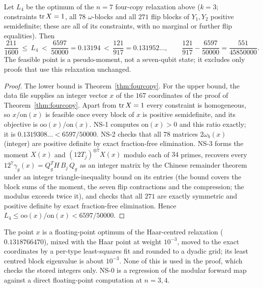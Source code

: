 \begin{proposition}\label{prop:fourcopy-not-sharp}
Let $L_4$ be the optimum of the $n=7$ four-copy relaxation above ($k=3$; constraints $\operatorname{tr} X=1$, all $78$
$\omega$-blocks and all $271$ flip blocks of $Y_1,Y_2$ positive semidefinite; these are all of its constraints,
with no marginal or further flip equalities). Then
\[
 \frac{211}{1600}\ \le\ L_4\ <\ \frac{6597}{50000}=0.13194\ <\ \frac{121}{917}=0.131952\ldots,
 \qquad \frac{121}{917}-\frac{6597}{50000}=\frac{551}{45850000}.
\]
The feasible point is a pseudo-moment, not a seven-qubit state; it excludes only proofs that use this
relaxation unchanged.
\end{proposition}
\begin{proof}
The lower bound is Theorem~\ref{thm:fourcopy}. For the upper bound, the data file supplies an integer
vector $x$ of the $167$ coordinates of the proof of Theorem~\ref{thm:fourcopy}. Apart from $\operatorname{tr} X=1$
every constraint is homogeneous, so $x/\mathrm{on}(x)$ is feasible once every block of $x$ is positive
semidefinite, and its objective is $\mathrm{oo}(x)/\mathrm{on}(x)$. NS-1 computes $\mathrm{on}(x)>0$
and this ratio exactly; it is $0.1319308\ldots<6597/50000$. NS-2 checks that all $78$ matrices
$2\omega_b(x)$ (integer) are positive definite by exact fraction-free elimination. NS-3 forms
the moment $X(x)$ and $(12T_j)^{\otimes7}X(x)$ modulo each of $34$ primes, recovers every
$12^7\gamma_g(x)=Q_g^TH\,B_j\,Q_g$ as an integer matrix by the Chinese remainder theorem under an
integer triangle-inequality bound on its entries (the bound covers the block sums of the moment, the seven
flip contractions and the compression; the modulus exceeds twice it), and checks that all $271$ are exactly symmetric and
positive definite by exact fraction-free elimination. Hence $L_4\le\mathrm{oo}(x)/\mathrm{on}(x)<6597/50000$.
\end{proof}

\begin{remark}
The point $x$ is a floating-point optimum of the Haar-centred relaxation
($0.1318766470$), mixed with the Haar point at weight $10^{-3}$, moved to the exact coordinates by a per-type
least-squares fit and rounded to a dyadic grid; its least centred block eigenvalue is about $10^{-3}$.
None of this is used in the proof, which checks the stored integers only. NS-0 is a regression of the
modular forward map against a direct floating-point computation at $n=3,4$.
\end{remark}
